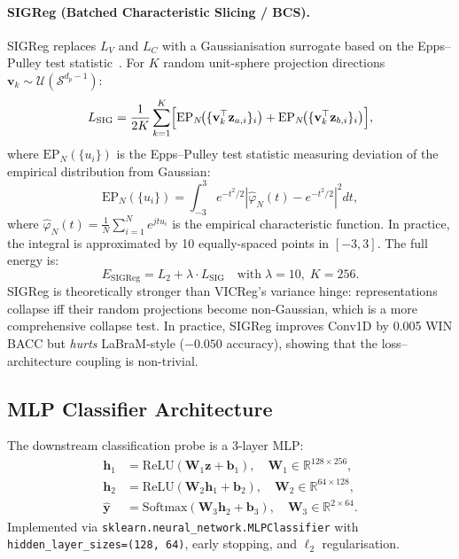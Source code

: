 \documentclass[11pt,a4paper]{article}
\begin{document}
\paragraph{SIGReg (Batched Characteristic Slicing / BCS).}
SIGReg replaces $L_V$ and $L_C$ with a Gaussianisation surrogate based on the
Epps--Pulley test statistic~\cite{epps1983}.  For $K$ random unit-sphere
projection directions $\mathbf{v}_k \sim \mathcal{U}(\mathcal{S}^{d_p-1})$:
\begin{equation}
  L_{\mathrm{SIG}} = \frac{1}{2K} \sum_{k=1}^{K}
    \Bigl[\mathrm{EP}_N\!\bigl(\{\mathbf{v}_k^\top \mathbf{z}_{a,i}\}_{i}\bigr)
         + \mathrm{EP}_N\!\bigl(\{\mathbf{v}_k^\top \mathbf{z}_{b,i}\}_{i}\bigr)\Bigr],
\end{equation}
where $\mathrm{EP}_N(\{u_i\})$ is the Epps--Pulley test statistic measuring
deviation of the empirical distribution from Gaussian:
\begin{equation}
  \mathrm{EP}_N(\{u_i\}) = \int_{-3}^{3}
    e^{-t^2/2} \left|\hat\varphi_N(t) - e^{-t^2/2}\right|^2 dt,
\end{equation}
where $\hat\varphi_N(t) = \frac{1}{N}\sum_{i=1}^{N} e^{jtu_i}$ is the empirical
characteristic function.  In practice, the integral is approximated by 10
equally-spaced points in $[-3, 3]$.
The full energy is:
\begin{equation}
  \boxed{E_{\mathrm{SIGReg}} = L_2 + \lambda \cdot L_{\mathrm{SIG}}}
  \quad\text{with}\; \lambda = 10,\; K{=}256.
\end{equation}
SIGReg is theoretically stronger than VICReg's variance hinge: representations
collapse iff their random projections become non-Gaussian, which is a more
comprehensive collapse test.  In practice, SIGReg improves Conv1D by 0.005
WIN BACC but \emph{hurts} LaBraM-style ($-0.050$ accuracy), showing that the
loss--architecture coupling is non-trivial.

\subsection{MLP Classifier Architecture}
\label{sec:math_mlp}

The downstream classification probe is a 3-layer MLP:
\begin{align}
  \mathbf{h}_1 &= \mathrm{ReLU}(\mathbf{W}_1 \mathbf{z} + \mathbf{b}_1),
    \quad \mathbf{W}_1 \in \mathbb{R}^{128 \times 256}, \\
  \mathbf{h}_2 &= \mathrm{ReLU}(\mathbf{W}_2 \mathbf{h}_1 + \mathbf{b}_2),
    \quad \mathbf{W}_2 \in \mathbb{R}^{64 \times 128}, \\
  \hat{\mathbf{y}} &= \mathrm{Softmax}(\mathbf{W}_3 \mathbf{h}_2 + \mathbf{b}_3),
    \quad \mathbf{W}_3 \in \mathbb{R}^{2 \times 64}.
\end{align}
Implemented via \texttt{sklearn.neural\_network.MLPClassifier} with
\texttt{hidden\_layer\_sizes=(128, 64)}, early stopping, and
$\ell_2$ regularisation.
\end{document}
